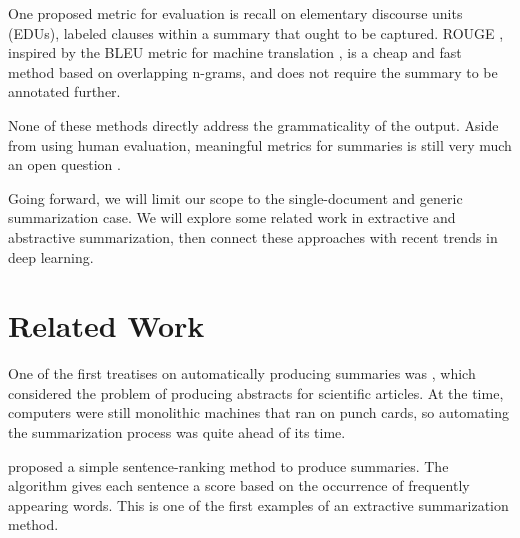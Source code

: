 \documentclass[12pt]{report}
\begin{document}
One proposed metric for evaluation is recall on elementary discourse units (EDUs), labeled clauses within a summary that ought to be captured. ROUGE \citep{lin2004rouge}, inspired by the BLEU metric for machine translation \citep{Papineni2002}, is a cheap and fast method based on overlapping n-grams, and does not require the summary to be annotated further.




None of these methods directly address the grammaticality of the output. Aside from using human evaluation, meaningful metrics for summaries is still very much an open question \citep{toutanova2016summarymetrics}.


\vspace{0.5cm}

 



Going forward, we will limit our scope to the single-document and generic summarization case. We will explore some related work in extractive and abstractive summarization, then connect these approaches with recent trends in deep learning.

\section{Related Work}

One of the first treatises on automatically producing summaries was \citet{luhn1958automatic}, which considered the problem of producing abstracts for scientific articles. At the time, computers were still monolithic machines that ran on punch cards, so automating the summarization process was quite ahead of its time.

\citet{luhn1958automatic} proposed a simple sentence-ranking method to produce summaries. The algorithm gives each sentence a score based on the occurrence of frequently appearing words. This is one of the first examples of an extractive summarization method.
\end{document}
